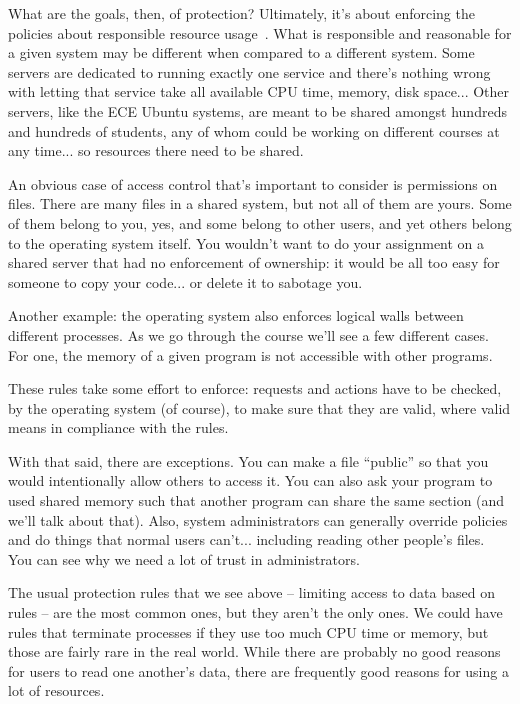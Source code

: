 What are the goals, then, of protection? Ultimately, it's about enforcing the policies about responsible resource usage~\cite{osc}. What is responsible and reasonable for a given system may be different when compared to a different system. Some servers are dedicated to running exactly one service and there's nothing wrong with letting that service take all available CPU time, memory, disk space... Other servers, like the ECE Ubuntu systems, are meant to be shared amongst hundreds and hundreds of students, any of whom could be working on different courses at any time... so resources there need to be shared. 

An obvious case of access control that's important to consider is permissions on files. There are many files in a shared system, but not all of them are yours. Some of them belong to you, yes, and some belong to other users, and yet others belong to the operating system itself. You wouldn't want to do your assignment on a shared server that had no enforcement of ownership: it would be all too easy for someone to copy your code... or delete it to sabotage you. 

Another example: the operating system also enforces logical walls between different processes. As we go through the course we'll see a few different cases. For one, the memory of a given program is not accessible with other programs.

These rules take some effort to enforce: requests and actions have to be checked, by the operating system (of course), to make sure that they are valid, where valid means in compliance with the rules.

With that said, there are exceptions. You can make a file ``public'' so that you would intentionally allow others to access it. You can also ask your program to used shared memory such that another program can share the same section (and we'll talk about that). Also, system administrators can generally override policies and do things that normal users can't... including reading other people's files. You can see why we need a lot of trust in administrators.

The usual protection rules that we see above -- limiting access to data based on rules -- are the most common ones, but they aren't the only ones. We could have rules that terminate processes if they use too much CPU time or memory, but those are fairly rare in the real world. While there are probably no good reasons for users to read one another's data, there are frequently good reasons for using a lot of resources. 

